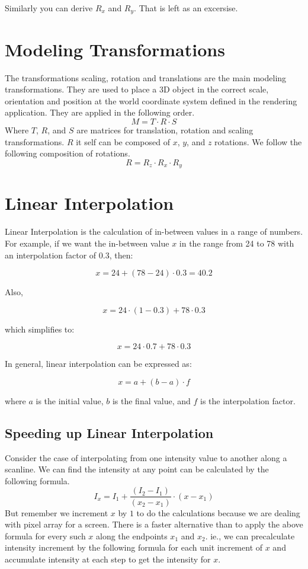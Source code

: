 Similarly you can derive \(R_x\) and \(R_y\). That is left as an excersise.
\section{Modeling Transformations}
The transformations scaling, rotation and translations are the main modeling transformations. They are used to place a 3D object in the correct scale, orientation and position at the world coordinate system defined in the rendering application. They are applied in the following order.
\begin{equation}
M = T \cdot R \cdot S
\end{equation}
Where $T$, $R$, and $S$ are matrices for translation, rotation and scaling transformations.  $R$ it self can be composed of $x$, $y$, and $z$ rotations. We follow the following composition of rotations.
\begin{equation}
R = R_z \cdot R_x \cdot R_y
\end{equation}

\section{Linear Interpolation}
Linear Interpolation is the calculation of in-between values in a range of numbers. For example, if we want the in-between value $x$ in the range from 24 to 78 with an interpolation factor of 0.3, then:

\[
x = 24 + (78 - 24) \cdot 0.3 = 40.2
\]

Also,

\[
x = 24 \cdot (1 - 0.3) + 78 \cdot 0.3
\]

which simplifies to:

\[
x = 24 \cdot 0.7 + 78 \cdot 0.3
\]

In general, linear interpolation can be expressed as:

\begin{equation}
x = a + (b - a) \cdot f
\end{equation}

where $a$ is the initial value, $b$ is the final value, and $f$ is the interpolation factor.


\subsection {Speeding up Linear Interpolation}
Consider the case of interpolating from one intensity value to another along a scanline. We can find the intensity at any point can be calculated by the following formula.
\[ 
I_x = I_1 + \frac{(I_2 - I_1)}{(x_2 - x_1)}  \cdot {(x-x_1)}
\]
But remember we increment $x$ by $1$ to do the calculations because we are dealing with pixel array for a screen.
There is a faster alternative than to apply the above formula for every such $x$ along the endpoints $x_1$ and $x_2$. ie., we can precalculate intensity increment by the following formula for each unit increment of $x$ and accumulate intensity at each step to get the intensity for $x$.

